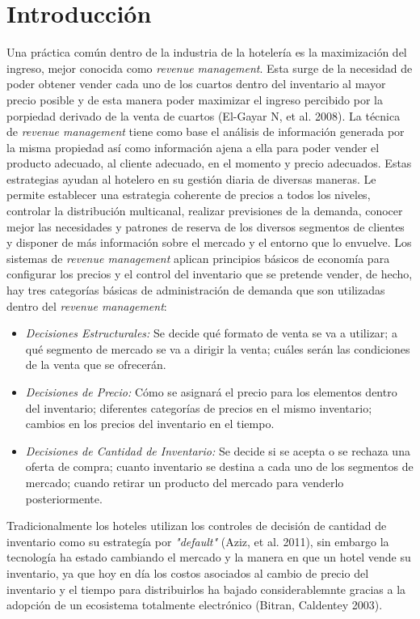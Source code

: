 \chapter{Introducción}
\label{ch:intro}
Una práctica común dentro de la industria de la hotelería es la maximización del ingreso, mejor conocida como \emph{revenue management}. Esta surge de la necesidad de poder obtener vender cada uno de los cuartos dentro del inventario al mayor precio posible y de esta manera poder maximizar el ingreso percibido por la porpiedad derivado de la venta de cuartos (El-Gayar N, et al. 2008).
La técnica de \emph{revenue management} tiene como base el análisis de información generada por la misma propiedad así como información ajena a ella para poder vender el producto adecuado, al cliente adecuado, en el momento y precio adecuados. Estas estrategias ayudan al hotelero en su gestión diaria de diversas maneras. Le permite establecer una estrategia coherente de precios a todos los niveles, controlar la distribución multicanal, realizar previsiones de la demanda, conocer mejor las necesidades y patrones de reserva de los diversos segmentos de clientes y disponer de más información sobre el mercado y el entorno que lo envuelve.
Los sistemas de \emph{revenue management} aplican principios básicos de economía para configurar los precios y el control del inventario que se pretende vender, de hecho, hay tres categorías básicas de administración de demanda que son utilizadas dentro del \emph{revenue management}:
\begin{itemize}
  \item \emph{Decisiones Estructurales:} Se decide qué formato de venta se va a utilizar; a qué segmento de mercado se va a dirigir la venta; cuáles serán las condiciones de la venta que se ofrecerán.
  \item \emph{Decisiones de Precio:} Cómo se asignará el precio para los elementos dentro del inventario; diferentes categorías de precios en el mismo inventario;  cambios en los precios del inventario en el tiempo.
  \item \emph{Decisiones de Cantidad de Inventario:} Se decide si se acepta o se rechaza una oferta de compra; cuanto inventario se destina a cada uno de los segmentos de mercado; cuando retirar un producto del mercado para venderlo posteriormente.
\end{itemize}
Tradicionalmente los hoteles utilizan los controles de decisión de cantidad de inventario como su estrategía por \emph{"default"} (Aziz, et al. 2011), sin embargo la tecnología ha estado cambiando el mercado y la manera en que un hotel vende su inventario, ya que hoy en día los costos asociados al cambio de precio del inventario y el tiempo para distribuirlos ha bajado considerablemnte gracias a la adopción de un ecosistema totalmente electrónico (Bitran, Caldentey 2003).
